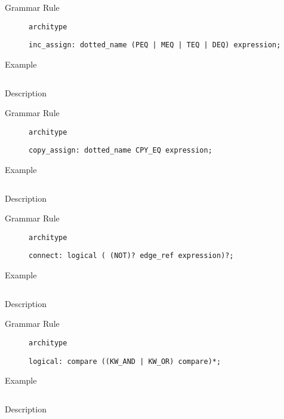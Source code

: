 \begin{description}
    \item[Grammar Rule] \texttt{architype}
          \begin{lstlisting}[style=gram]
inc_assign: dotted_name (PEQ | MEQ | TEQ | DEQ) expression;
\end{lstlisting}
    \item[Example] \texttt{}
          \begin{lstlisting}
\end{lstlisting}

    \item[Description]
\end{description}

\begin{description}
    \item[Grammar Rule] \texttt{architype}
          \begin{lstlisting}[style=gram]
copy_assign: dotted_name CPY_EQ expression;
\end{lstlisting}
    \item[Example] \texttt{}
          \begin{lstlisting}
    \end{lstlisting}

    \item[Description]
\end{description}


\begin{description}
    \item[Grammar Rule] \texttt{architype}
          \begin{lstlisting}[style=gram]
connect: logical ( (NOT)? edge_ref expression)?;
\end{lstlisting}
    \item[Example] \texttt{}
          \begin{lstlisting}
    \end{lstlisting}

    \item[Description]
\end{description}


\begin{description}
    \item[Grammar Rule] \texttt{architype}
          \begin{lstlisting}[style=gram]
logical: compare ((KW_AND | KW_OR) compare)*;
\end{lstlisting}
    \item[Example] \texttt{}
          \begin{lstlisting}
    \end{lstlisting}

    \item[Description]
\end{description}



